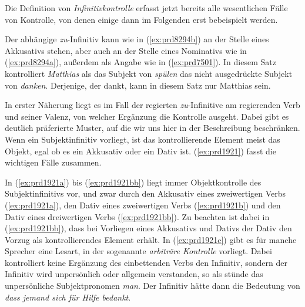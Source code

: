 Die Definition von \textit{Infinitivkontrolle} erfasst jetzt bereits alle wesentlichen Fälle von Kontrolle, von denen einige dann im Folgenden erst bebeispielt werden.


Der abhängige \textit{zu}-Infinitiv kann wie in (\ref{ex:prd8294b}) an der Stelle eines Akkusativs stehen, aber auch an der Stelle eines Nominativs wie in (\ref{ex:prd8294a}), außerdem als Angabe wie in (\ref{ex:prd7501}).
In diesem Satz kontrolliert \textit{Matthias} als das Subjekt von \textit{spülen} das nicht ausgedrückte Subjekt von \textit{danken}.
Derjenige, der dankt, kann in diesem Satz nur Matthias sein.

\begin{exe}
\end{exe}

In erster Näherung liegt es im Fall der regierten \textit{zu}-Infinitive am regierenden Verb und seiner Valenz, von welcher Ergänzung die Kontrolle ausgeht.
Dabei gibt es deutlich präferierte Muster, auf die wir uns hier in der Beschreibung beschränken.
Wenn ein Subjektinfinitiv vorliegt, ist das kontrollierende Element meist das Objekt, egal ob es ein Akkusativ oder ein Dativ ist.
(\ref{ex:prd1921}) fasst die wichtigen Fälle zusammen.

\begin{exe}
  \ex\label{ex:prd1921} 
  \begin{xlist}
  \end{xlist}
\end{exe}

In (\ref{ex:prd1921a}) bis (\ref{ex:prd1921bb}) liegt immer Objektkontrolle des Subjektinfinitivs vor, und zwar durch den Akkusativ eines zweiwertigen Verbs (\ref{ex:prd1921a}), den Dativ eines zweiwertigen Verbs (\ref{ex:prd1921b}) und den Dativ eines dreiwertigen Verbs (\ref{ex:prd1921bb}).
Zu beachten ist dabei in (\ref{ex:prd1921bb}), dass bei Vorliegen eines Akkusativs und Dativs der Dativ den Vorzug als kontrollierendes Element erhält.
In (\ref{ex:prd1921c}) gibt es für manche Sprecher eine Lesart, in der sogenannte \textit{arbiträre Kontrolle} vorliegt.
Dabei kontrolliert keine Ergänzung des einbettenden Verbs den Infinitiv, sondern der Infinitiv wird unpersönlich oder allgemein verstanden, so als stünde das unpersönliche Subjektpronomen \textit{man}.
Der Infinitiv hätte dann die Bedeutung von \textit{dass jemand sich für Hilfe bedankt}.

